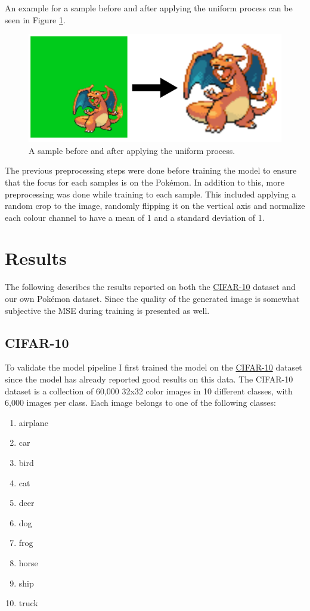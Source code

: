 \documentclass[12pt]{article}
\theoremstyle{plain}
\theoremstyle{definition}
\theoremstyle{remark}
\begin{document}
An example for a sample before and after applying the uniform process can be seen in Figure \ref{fig:preprocessingpipeline}.

\begin{figure}[h]
	\centering
	\includegraphics[width=0.5\linewidth]{src/Images/preprocessing_pipeline}
	\caption[Before and After Uniform Process]{A sample before and after applying the uniform process.}
	\label{fig:preprocessingpipeline}
\end{figure}

The previous preprocessing steps  were  done before training the model to ensure that the focus for each samples is on the Pokémon. In addition to this, more preprocessing was done while training to each sample. This included applying a random crop to the image, randomly flipping it on the vertical axis and normalize each colour channel to have a mean of 1 and a standard deviation of 1.


\section{Results}\label{sec:results}
The following describes the results reported on both the \href{https://www.cs.toronto.edu/~kriz/cifar.html}{\ac{CIFAR-10}} dataset and our own Pokémon dataset. Since the quality of the generated image is somewhat subjective the \ac{MSE} during training is presented as well. 


\subsection{\ac{CIFAR-10}}\label{sec:results:cifar10}
To validate the model pipeline I first trained the model on the \href{https://www.cs.toronto.edu/~kriz/cifar.html}{\ac{CIFAR-10}} dataset since the model has already reported good results on this data. The \ac{CIFAR-10} dataset is a collection of 60,000 32x32 color images in 10 different classes, with 6,000 images per class. Each image belongs to one of the following classes:

\begin{multicols}{5}
	\begin{enumerate}[itemsep=2pt,parsep=2pt]
		\item airplane
		\item car
		\item bird
		\item cat
		\item deer
		\item dog
		\item frog 
		\item horse
		\item ship
		\item truck
	\end{enumerate}
\end{multicols}
\end{document}

